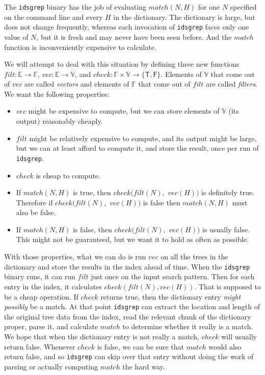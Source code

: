 \documentclass[twocolumn]{report}
\begin{document}
The \texttt{idsgrep} binary has the job of evaluating $\mathit{match}(N,H)$
for one $N$ specified on the command line and every $H$ in the
dictionary.  The dictionary is large, but does not change frequently,
whereas each invocation of \texttt{idsgrep} faces only one value of $N$, but
it is fresh and may never have been seen before.  And the $\mathit{match}$
function is inconveniently expensive to calculate.

We will attempt to deal with this situation by defining three new functions
$\mathit{filt}:\mathbb{E}\rightarrow\mathbb{F}$,
$\mathit{vec}:\mathbb{E}\rightarrow\mathbb{V}$,
and $\mathit{check}:\mathbb{F}\times\mathbb{V}\rightarrow
\{\mathsf{T},\mathsf{F}\}$.
Elements of $\mathbb{V}$ that come out of $\mathit{vec}$ are called
\emph{vectors} and elements of $\mathbb{F}$ that come out of $\mathit{filt}$
are called \emph{filters}.
We want the following properties:
\begin{itemize}
  \item $\mathit{vec}$ might be expensive to compute, but we can store
    elements of $\mathbb{V}$ (its output) reasonably cheaply.
  \item $\mathit{filt}$ might be relatively expensive to compute, and its
    output might be large, but we can at least
    afford to compute it, and store the
    result, once per run of \texttt{idsgrep}.
  \item $\mathit{check}$ is cheap to compute.
  \item If $\mathit{match}(N,H)$ is true, then
    $\mathit{check}(\mathit{filt}(N),$ $\mathit{vec}(H))$ is definitely true. 
    Therefore if $\mathit{check}(\mathit{filt}(N),$ $\mathit{vec}(H))$ is
    false then $\mathit{match}(N,H)$ must also be false.
  \item If $\mathit{match}(N,H)$ is false, then
    $\mathit{check}(\mathit{filt}(N),$ $\mathit{vec}(H))$ is usually false.
    This might not be guaranteed, but we want it to hold as often as
    possible.
\end{itemize}

With those properties, what we can do is run $\mathit{vec}$ on all the trees
in the dictionary and store the results in the index ahead of time.  When
the \texttt{idsgrep} binary runs, it can run $\mathit{filt}$ just once on
the input search pattern.  Then for each entry in the index, it calculates
$\mathit{check}(\mathit{filt}(N),\mathit{vec}(H))$.  That is supposed to be
a cheap operation.  If $\mathit{check}$ returns true, then the dictionary
entry \emph{might possibly} be a match.  At that point \texttt{idsgrep} can
extract the location and length of the original tree data from the index,
read the relevant chunk of the dictionary proper, parse it, and calculate
$\mathit{match}$ to determine whether it really is a match.  We hope that
when the dictionary entry is not really a match, $\mathit{check}$ will
usually return false.  Whenever $\mathit{check}$ is false, we can be sure
that $\mathit{match}$ would also return false, and so \texttt{idsgrep} can
skip over that entry without doing the work of parsing or actually computing
$\mathit{match}$ the hard way.
\end{document}
